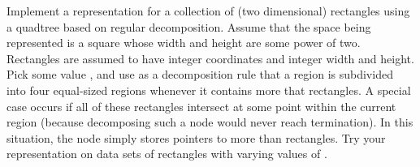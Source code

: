\begin{projects}
\item
Implement a representation for a collection of (two dimensional)
rectangles using a quadtree based on regular decomposition.
Assume that the space being represented is a square whose width and
height are some power of two.
Rectangles are assumed to have integer coordinates and integer width
and height.
Pick some value , and use as a decomposition rule that a region
is subdivided into four equal-sized regions whenever it contains more
that  rectangles.
A special case occurs if all of these rectangles intersect at some
point within the current region (because decomposing such a node would
never reach termination).
In this situation, the node simply stores pointers to more than
 rectangles.
Try your representation on data sets of rectangles with varying values
of .
\end{projects}
